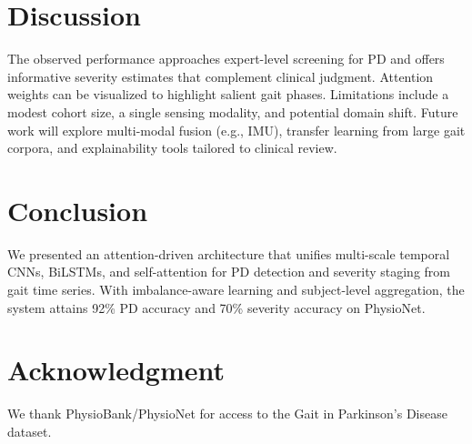 \documentclass[conference]{IEEEtran}
\begin{document}
\section{Discussion}
The observed performance approaches expert-level screening for PD and offers informative severity estimates that complement clinical judgment. Attention weights can be visualized to highlight salient gait phases. Limitations include a modest cohort size, a single sensing modality, and potential domain shift. Future work will explore multi-modal fusion (e.g., IMU), transfer learning from large gait corpora, and explainability tools tailored to clinical review.

\section{Conclusion}
We presented an attention-driven architecture that unifies multi-scale temporal CNNs, BiLSTMs, and self-attention for PD detection and severity staging from gait time series. With imbalance-aware learning and subject-level aggregation, the system attains 92\% PD accuracy and 70\% severity accuracy on PhysioNet.

\section*{Acknowledgment}
We thank PhysioBank/PhysioNet for access to the Gait in Parkinson's Disease dataset.
\end{document}
